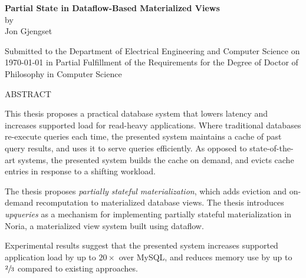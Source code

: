 \documentclass[fontsize=12pt,paper=letter]{scrartcl}
\begin{document}
\begin{titlepage}
  \begin{center}
    \textbf{\large Partial State in Dataflow-Based Materialized Views}\\
    \vspace{0.5\baselineskip}
    by\\
    \vspace{0.5\baselineskip}
    {\large Jon Gjengset}\\
    \vspace{0.5\baselineskip}
    \begin{addmargin}[0.15in]{0.15in}
      \centering
    Submitted to the Department of
    Electrical Engineering and Computer Science
    on \today{}
    in Partial Fulfillment of the Requirements for the Degree of
    Doctor of Philosophy in Computer Science
    \end{addmargin}
  \end{center}

  \vspace{0.5\baselineskip}
  \begin{flushleft}
  ABSTRACT
  \vspace{0.5\baselineskip}

  This thesis proposes a practical database system that lowers latency and
    increases supported load for read-heavy applications. Where traditional
    databases re-execute queries each time, the presented system maintains a
    cache of past query results, and uses it to serve queries efficiently. As
    opposed to state-of-the-art systems, the presented system builds the cache
    on demand, and evicts cache entries in response to a shifting workload.

  \vspace{0.5\baselineskip}

  The thesis proposes \textit{partially stateful materialization}, which adds
    eviction and on-demand recomputation to materialized database views. The
    thesis introduces \textit{upqueries} as a mechanism for implementing
    partially stateful materialization in Noria, a materialized view system
    built using dataflow.

  \vspace{0.5\baselineskip}

  Experimental results suggest that the presented system increases supported
    application load by up to $20\times$ over MySQL, and reduces memory use by
    up to $\sfrac{2}{3}$ compared to existing approaches.


\end{flushleft}
\end{titlepage}
\end{document}
